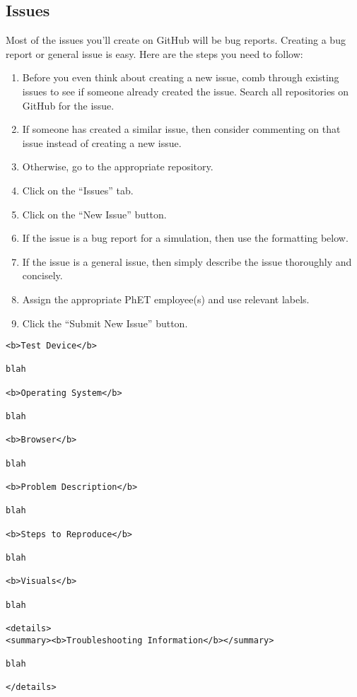 \documentclass[titlepage]{article}
\begin{document}
	\subsection{Issues}

Most of the issues you'll create on GitHub will be bug reports. Creating a bug report or general issue is easy. Here are the steps you need to follow:

		\begin{enumerate}
			\item Before you even think about creating a new issue, comb through existing issues to see if someone already created the issue. Search all repositories on GitHub for the issue.
			\item If someone has created a similar issue, then consider commenting on that issue instead of creating a new issue.
			\item Otherwise, go to the appropriate repository.
			\item Click on the ``Issues'' tab.
			\item Click on the ``New Issue'' button.
			\item If the issue is a bug report for a simulation, then use the formatting below.
			\item If the issue is a general issue, then simply describe the issue thoroughly and concisely.
			\item Assign the appropriate PhET employee(s) and use relevant labels.
			\item Click the ``Submit New Issue'' button.
		\end{enumerate}

		\begin{lstlisting}[frame=single, caption={Correct Bug Report Format}]
<b>Test Device</b>

blah

<b>Operating System</b>

blah

<b>Browser</b>

blah

<b>Problem Description</b>

blah

<b>Steps to Reproduce</b>

blah

<b>Visuals</b>

blah

<details>
<summary><b>Troubleshooting Information</b></summary>

blah

</details>
		\end{lstlisting}
\end{document}
